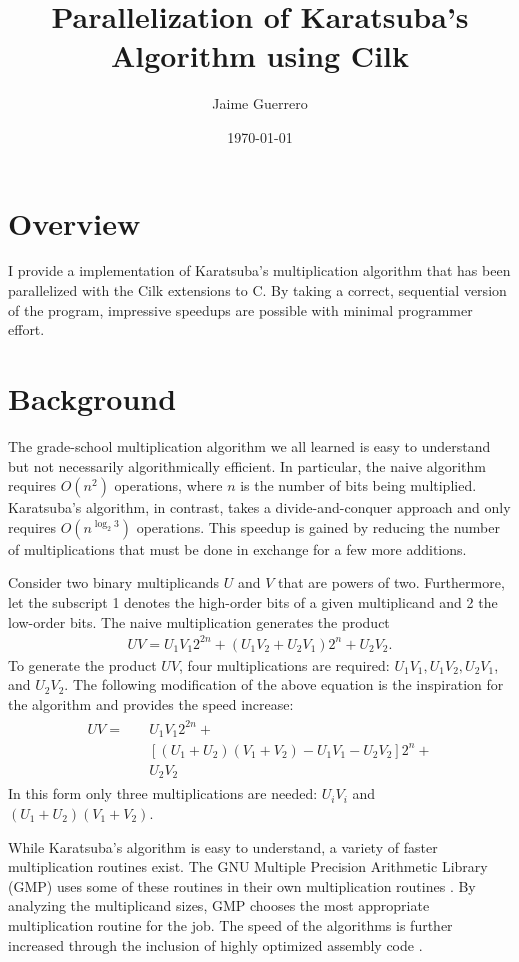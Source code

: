 \documentclass[8pt, twocolumn]{article}
\author{Jaime Guerrero}
\title{Parallelization of Karatsuba's Algorithm using Cilk}
\date{\today}
\begin{document}
\maketitle

\section{Overview}
I provide a implementation of Karatsuba's multiplication algorithm that has
been parallelized with the Cilk extensions to C.  By taking a correct,
sequential version of the program, impressive speedups are possible with
minimal programmer effort.

\section{Background}
The grade-school multiplication algorithm we all learned is easy to understand
but not necessarily algorithmically efficient.  In particular, the naive
algorithm requires $O(n^2)$ operations, where $n$ is the number of bits being
multiplied.  Karatsuba's algorithm, in contrast, takes a divide-and-conquer
approach and only requires $O(n^{\log_2 3})$ operations.  This speedup is gained
by reducing the number of multiplications that must be done in
exchange for a few more additions.

Consider two binary multiplicands $U$ and $V$ that are powers of two.
Furthermore, let the subscript 1 denotes the high-order bits of a given
multiplicand and 2 the low-order bits.  The naive multiplication generates the
product
\begin{align}
   UV = U_1 V_1 2^{2n} + (U_1 V_2 + U_2 V_1)2^n + U_2 V_2.
\end{align}
To generate the product $UV$, four multiplications are required: $U_1V_1,
U_1V_2, U_2V_1$, and $U_2 V_2$.  The following modification of the
above equation is the inspiration for the algorithm and provides the speed increase:
\begin{align}
\begin{split}
UV = \quad & U_1 V_1 2^{2n} + \\ &[(U_1 + U_2)(V_1 + V_2) - U_1 V_1 - U_2 V_2]2^n + \\
     & U_2 V_2
\end{split}
\end{align}
In this form only three multiplications are needed: $U_iV_i$ and $(U_1 + U_2)(V_1 + V_2)$.

While Karatsuba's algorithm is easy to understand, a variety of faster
multiplication routines exist. The GNU Multiple Precision Arithmetic Library
(GMP) uses some of these routines in their own multiplication routines
\cite{gmp-mult}. By analyzing the multiplicand sizes, GMP chooses the most
appropriate multiplication routine for the job.  The speed of the algorithms is
further increased through the inclusion of highly optimized assembly code
\cite{gmp-home}.
\end{document}
